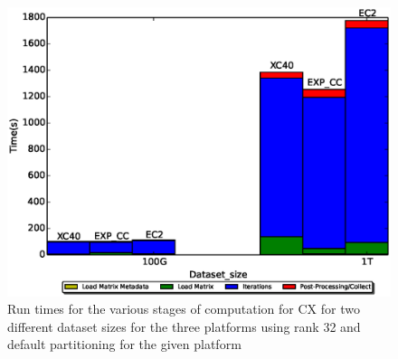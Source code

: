         \begin{figure} [H]
    \begin{centering}
    \includegraphics[scale=0.4]{images/CX_Size_Scaling_Rank_32_Partitions_default.eps}
    \end{centering}
    \caption{ Run times for the various stages of computation for CX for two different dataset sizes for the three platforms using rank 32 and default partitioning for the given platform}
    \label{fig:h2hrank32} 
    \end{figure}
    
